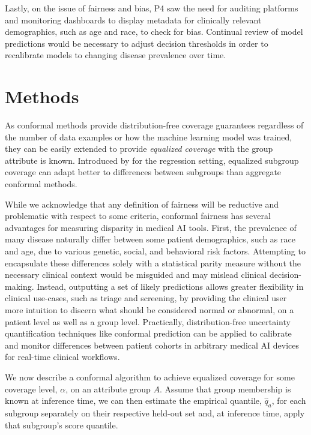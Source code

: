 \documentclass[letterpaper]{article} %
\begin{document}
Lastly, on the issue of fairness and bias, P4 saw the need for auditing platforms and monitoring dashboards to display metadata for clinically relevant demographics, such as age and race, to check for bias.
Continual review of model predictions would be necessary to adjust decision thresholds in order to recalibrate models to changing disease prevalence over time.

\section{Methods}
As conformal methods provide distribution-free coverage guarantees regardless of the number of data examples or how the machine learning model was trained, they can be easily extended to provide \textit{equalized coverage} with the group attribute is known.
Introduced by \citet{Romano2020With} for the regression setting, equalized subgroup coverage can adapt better to differences between subgroups than aggregate conformal methods.

While we acknowledge that any definition of fairness will be reductive and problematic with respect to some criteria, conformal fairness has several advantages for measuring disparity in medical AI tools.
First, the prevalence of many disease naturally differ between some patient demographics, such as race and age, due to various genetic, social, and behavioral risk factors.
Attempting to encapsulate these differences solely with a statistical parity measure without the necessary clinical context would be misguided and may mislead clinical decision-making.
Instead, outputting a set of likely predictions allows greater flexibility in clinical use-cases, such as triage and screening, by providing the clinical user more intuition to discern what should be considered normal or abnormal, on a patient level as well as a group level.
Practically, distribution-free uncertainty quantification techniques like conformal prediction can be applied to calibrate and monitor differences between patient cohorts in arbitrary medical AI devices for real-time clinical workflows.

We now describe a conformal algorithm to achieve equalized coverage for some coverage level, $\alpha$, on an attribute group $A$.
Assume that group membership is known at inference time, we can then estimate the empirical quantile, $\hat{q}_a$, for each subgroup separately on their respective held-out set and, at inference time, apply that subgroup's score quantile.
\end{document}

